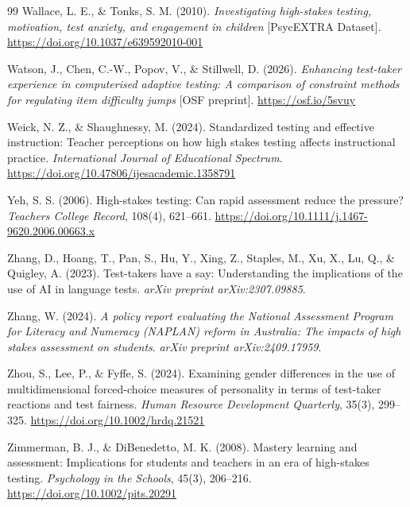 \documentclass[11pt]{article}
\begin{document}
\begin{thebibliography}{99}
Wallace, L. E., \& Tonks, S. M. (2010). \textit{Investigating high-stakes testing, motivation, test anxiety, and engagement in children} [PsycEXTRA Dataset]. \url{https://doi.org/10.1037/e639592010-001}

Watson, J., Chen, C.-W., Popov, V., \& Stillwell, D. (2026). \textit{Enhancing test-taker experience in computerised adaptive testing: A comparison of constraint methods for regulating item difficulty jumps} [OSF preprint]. \url{https://osf.io/5svuy}

Weick, N. Z., \& Shaughnessy, M. (2024). Standardized testing and effective instruction: Teacher perceptions on how high stakes testing affects instructional practice. \textit{International Journal of Educational Spectrum}. \url{https://doi.org/10.47806/ijesacademic.1358791}

Yeh, S. S. (2006). High-stakes testing: Can rapid assessment reduce the pressure? \textit{Teachers College Record}, 108(4), 621--661. \url{https://doi.org/10.1111/j.1467-9620.2006.00663.x}

Zhang, D., Hoang, T., Pan, S., Hu, Y., Xing, Z., Staples, M., Xu, X., Lu, Q., \& Quigley, A. (2023). Test-takers have a say: Understanding the implications of the use of AI in language tests. \textit{arXiv preprint arXiv:2307.09885}.

Zhang, W. (2024). \textit{A policy report evaluating the National Assessment Program for Literacy and Numeracy (NAPLAN) reform in Australia: The impacts of high stakes assessment on students}. \textit{arXiv preprint arXiv:2409.17959}.

Zhou, S., Lee, P., \& Fyffe, S. (2024). Examining gender differences in the use of multidimensional forced-choice measures of personality in terms of test-taker reactions and test fairness. \textit{Human Resource Development Quarterly}, 35(3), 299--325. \url{https://doi.org/10.1002/hrdq.21521}

Zimmerman, B. J., \& DiBenedetto, M. K. (2008). Mastery learning and assessment: Implications for students and teachers in an era of high-stakes testing. \textit{Psychology in the Schools}, 45(3), 206--216. \url{https://doi.org/10.1002/pits.20291}

\end{thebibliography}
\end{document}
